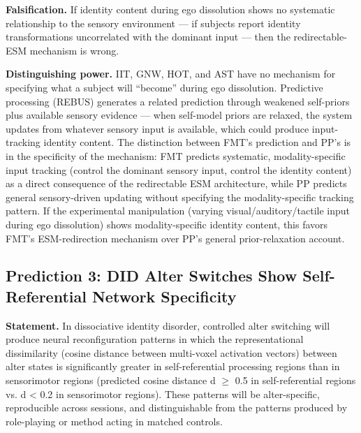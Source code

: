 \documentclass[12pt]{article}
\begin{document}
\textbf{Falsification.} If identity content during ego dissolution shows no systematic relationship to the sensory environment --- if subjects report identity transformations uncorrelated with the dominant input --- then the redirectable-ESM mechanism is wrong.

\textbf{Distinguishing power.} IIT, GNW, HOT, and AST have no mechanism for specifying what a subject will ``become'' during ego dissolution. Predictive processing (REBUS) generates a related prediction through weakened self-priors plus available sensory evidence --- when self-model priors are relaxed, the system updates from whatever sensory input is available, which could produce input-tracking identity content. The distinction between FMT's prediction and PP's is in the specificity of the mechanism: FMT predicts systematic, modality-specific input tracking (control the dominant sensory input, control the identity content) as a direct consequence of the redirectable ESM architecture, while PP predicts general sensory-driven updating without specifying the modality-specific tracking pattern. If the experimental manipulation (varying visual/auditory/tactile input during ego dissolution) shows modality-specific identity content, this favors FMT's ESM-redirection mechanism over PP's general prior-relaxation account.


\subsection{Prediction 3: DID Alter Switches Show Self-Referential Network Specificity}


\textbf{Statement.} In dissociative identity disorder, controlled alter switching will produce neural reconfiguration patterns in which the representational dissimilarity (cosine distance between multi-voxel activation vectors) between alter states is significantly greater in self-referential processing regions than in sensorimotor regions (predicted cosine distance d $\geq$ 0.5 in self-referential regions vs. d < 0.2 in sensorimotor regions). These patterns will be alter-specific, reproducible across sessions, and distinguishable from the patterns produced by role-playing or method acting in matched controls.
\end{document}
